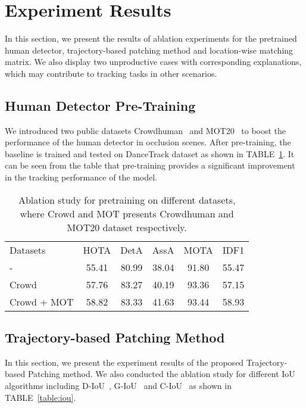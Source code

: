 \documentclass[10pt,twocolumn,letterpaper]{article}
\begin{document}
\section{Experiment Results}

In this section, we present the results of ablation experiments for the pretrained human detector, trajectory-based patching method and location-wise matching matrix. We also display two unproductive cases with corresponding explanations, which may contribute to tracking tasks in other scenarios.

\subsection{Human Detector Pre-Training}

We introduced two public datasets Crowdhuman~\cite{shao2018crowdhuman} and MOT20~\cite{dendorfer2020mot20} to boost the performance of the human detector in occlusion scenes. After pre-training, the baseline is trained and tested on DanceTrack dataset as shown in {TABLE~\ref{table:pretrain}}. It can be seen from the table that pre-training provides a significant improvement in the tracking performance of the model.

\setlength{\tabcolsep}{4pt}
\begin{table}
\begin{center}
\caption{Ablation study for pretraining on different datasets, where Crowd and MOT presents Crowdhuman and MOT20 dataset respectively. }
\label{table:pretrain}
\begin{tabular}{lccccc}
\hline\noalign{\smallskip}
Datasets & HOTA & DetA & AssA & MOTA & IDF1\\
\noalign{\smallskip}
\hline
\noalign{\smallskip}
- & 55.41 & 80.99 & 38.04 & 91.80 & 55.47\\
Crowd & 57.76 & 83.27 & 40.19 & 93.36 & 57.15\\
Crowd + MOT & 58.82 & 83.33 & 41.63 & 93.44 & 58.93\\
\hline
\end{tabular}
\end{center}
\end{table}
\setlength{\tabcolsep}{1.4pt}


\subsection{Trajectory-based Patching Method}

In this section, we present the experiment results of the proposed Trajectory-based Patching method. We also conducted the ablation study for different IoU algorithms including D-IoU~\cite{zheng2020distance}, G-IoU~\cite{rezatofighi2019generalized} and C-IoU~\cite{zheng2020distance} as shown in TABLE~\ref{table:iou}. 
\end{document}

